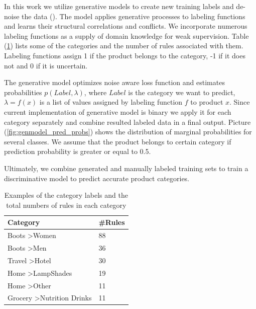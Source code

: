 
In this work we utilize generative models to create new training labels and de-noise the data (\cite{genmodels}).
The model applies generative processes to labeling functions and learns their structural correlations and conflicts.
We incorporate numerous labeling functions as a supply of domain knowledge for weak supervision. Table (\ref{tab:numrules})
lists some of the categories and the number of rules associated with them. Labeling functions assign 1 if the product belongs
to the category, -1 if it does not and 0 if it is uncertain\cite{genmodels}.

The generative model optimizes noise aware loss function and estimates probabilities $p(Label, \lambda)$,
where $Label$ is the category we want to predict, $\lambda = f(x)$ is a list of values assigned by labeling
function $f$ to product $x$.  Since current implementation of generative model is binary we apply it for each
category separately and combine resulted labeled data in a final output. Picture (\ref{fig:genmodel_pred_probs}) shows
the distribution of marginal probabilities for several classes. We assume that the product belongs to certain category if
prediction probability is greater or equal to 0.5.

Ultimately, we combine generated and manually labeled training sets to train a discriminative model to predict accurate product categories.

\begin{table}
  \caption{Examples of the category labels and the total numbers of rules in each category}
  \label{tab:numrules}
  \begin{tabular}{ll}
    \toprule
    Category & \#Rules\\
    \midrule
    Boots \textgreater Women &	88	\\
    Boots \textgreater Men	& 36 \\
 	Travel \textgreater Hotel & 30 \\
 	Home \textgreater LampShades & 19 \\
 	Home \textgreater Other & 11 \\
 	Grocery \textgreater Nutrition Drinks & 11 \\
    \bottomrule
  \end{tabular}
\end{table}

